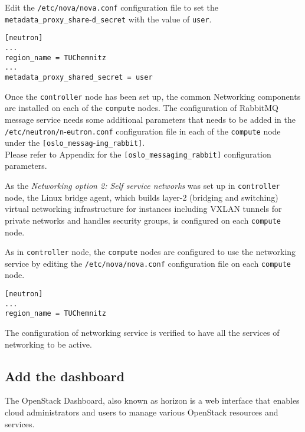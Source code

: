 Edit the \verb|/etc/nova/nova.conf| configuration file to set the \verb|metadata_proxy_share|-\verb|d_secret| with the value of \verb|user|.
\begin{lstlisting}[frame=single]
[neutron]
...
region_name = TUChemnitz
...
metadata_proxy_shared_secret = user
\end{lstlisting}

Once the \verb|controller| node has been set up, the common Networking components are installed on each of the \verb|compute| nodes.
The configuration of RabbitMQ message service needs some additional parameters that needs to be added in the \verb|/etc/neutron/n|-\verb|eutron.conf| configuration file in each of the \verb|compute| node under the \verb|[oslo_messag|-\verb|ing_rabbit]|.
\\Please refer to Appendix  for the \verb|[oslo_messaging_rabbit]| configuration parameters.


As the \textit{Networking option 2: Self service networks} was set up in \verb|controller| node, the Linux bridge agent, which builds layer-2 (bridging and switching) virtual networking infrastructure for instances including VXLAN tunnels for private networks and handles security groups, is configured on each \verb|compute| node.

As in \verb|controller| node, the \verb|compute| nodes are configured to use the networking service by editing the \verb|/etc/nova/nova.conf| configuration file on each \verb|compute| node.
\begin{lstlisting}[frame=single]
[neutron]
...
region_name = TUChemnitz
\end{lstlisting}

The configuration of networking service is verified to have all the services of networking to be active.

\subsection{Add the dashboard}\label{ssec:Addthedashboard}
The OpenStack Dashboard, also known as horizon is a web interface that enables cloud administrators and users to manage various OpenStack resources and services.


